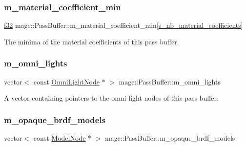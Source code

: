 \subsubsection{\texorpdfstring{m\+\_\+material\+\_\+coefficient\+\_\+min}{m\_material\_coefficient\_min}}
{\footnotesize\ttfamily \hyperlink{namespacemage_a6a44ad388483959dc4dff9f2aef91431}{f32} mage\+::\+Pass\+Buffer\+::m\+\_\+material\+\_\+coefficient\+\_\+min\mbox{[}\hyperlink{structmage_1_1_pass_buffer_a453e18abdf29c4ebb08d9e002a952bf2}{s\+\_\+nb\+\_\+material\+\_\+coefficients}\mbox{]}\hspace{0.3cm}{\ttfamily [private]}}

The minima of the material coefficients of this pass buffer. \hypertarget{structmage_1_1_pass_buffer_ab4553bc8afe80eff1f52d511cd23e90b}{}\label{structmage_1_1_pass_buffer_ab4553bc8afe80eff1f52d511cd23e90b} 
\subsubsection{\texorpdfstring{m\+\_\+omni\+\_\+lights}{m\_omni\_lights}}
{\footnotesize\ttfamily vector$<$ const \hyperlink{namespacemage_a1724c6e6b6b5ba535cdd967cbbb4a669}{Omni\+Light\+Node} $\ast$ $>$ mage\+::\+Pass\+Buffer\+::m\+\_\+omni\+\_\+lights\hspace{0.3cm}{\ttfamily [private]}}

A vector containing pointers to the omni light nodes of this pass buffer. \hypertarget{structmage_1_1_pass_buffer_a7b866f3637755bfb2d951fe8a3495bea}{}\label{structmage_1_1_pass_buffer_a7b866f3637755bfb2d951fe8a3495bea} 
\subsubsection{\texorpdfstring{m\+\_\+opaque\+\_\+brdf\+\_\+models}{m\_opaque\_brdf\_models}}
{\footnotesize\ttfamily vector$<$ const \hyperlink{classmage_1_1_model_node}{Model\+Node} $\ast$ $>$ mage\+::\+Pass\+Buffer\+::m\+\_\+opaque\+\_\+brdf\+\_\+models\hspace{0.3cm}{\ttfamily [private]}}

